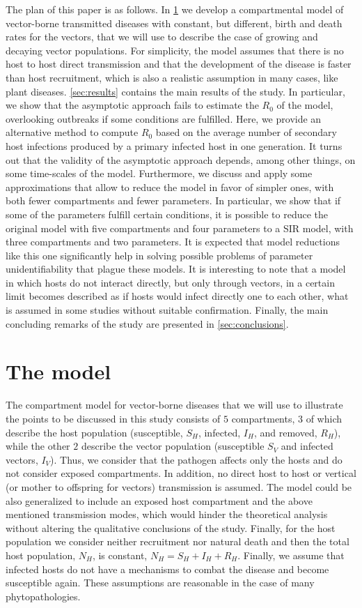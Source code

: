 The plan of this paper is as follows. In \cref{sec:model} we develop a
compartmental model of vector-borne transmitted diseases with constant, but
different, birth and death rates for the vectors, that we will use to describe
the case of growing and decaying vector populations. For simplicity, the model
assumes that there is no host to host direct transmission and that the
development of the disease is faster than host recruitment, which is also a
realistic assumption in  many cases, like plant diseases. \cref{sec:results}
contains the main results of the study. In particular, we show that the
asymptotic approach fails to estimate the $R_0$ of the model, overlooking
outbreaks if some conditions are fulfilled. Here, we provide an alternative
method to compute $R_0$ based on the average number of secondary host
infections produced by a primary infected host in one generation. It turns out
that the validity of the  asymptotic approach depends, among other things, on
some time-scales of the model. Furthermore, we discuss and apply some
approximations that allow to reduce the model in favor of simpler ones, with
both fewer compartments and fewer parameters. In particular, we show that if
some of the parameters fulfill certain conditions, it is possible to reduce the
original model with five compartments and four parameters to a SIR model, with
three compartments and two parameters. It is expected that model reductions
like this one significantly help in solving possible problems of parameter
unidentifiability that plague these models. It is interesting to note that a
model in which hosts do not interact directly, but only through vectors, in a
certain limit becomes described as if hosts would infect directly one to each
other, what is assumed in some studies without suitable confirmation. Finally,
the main concluding remarks of the study are presented in
\cref{sec:conclusions}.

\section{The model}\label{sec:model}

The compartment model for vector-borne diseases that we will use to
illustrate the points to be discussed in this study consists of $5$
compartments, $3$ of which describe the host population (susceptible, $S_H$,
infected, $I_H$, and removed, $R_H$), while the other $2$ describe the vector
population (susceptible $S_V$ and infected vectors, $I_V$). Thus, we consider
that the pathogen affects only the hosts and do not consider exposed
compartments. In addition, no direct host to host or vertical (or mother to
offspring for vectors) transmission is assumed. The model could be also
generalized to include an exposed host compartment and the above mentioned
transmission modes, which would hinder the theoretical analysis without
altering the qualitative conclusions of the study. Finally, for the host
population we consider neither recruitment nor natural death and then the total
host population, $N_H$, is constant, $N_H=S_H+I_H+R_H$. Finally, we assume that
infected hosts do not have a mechanisms to combat the disease and become
susceptible again. These assumptions are reasonable in the case of many
phytopathologies.

